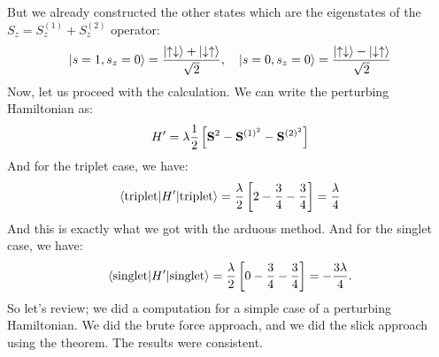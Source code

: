 But we already constructed the other states which are the eigenstates of the $S_z = S_z^{(1)} + S_z^{(2)}$ operator:
\begin{equation}
    \lvert s = 1, s_z = 0 \rangle = \frac{\lvert \uparrow\downarrow \rangle + \lvert \downarrow\uparrow \rangle}{\sqrt{2}}, \quad \lvert s = 0, s_z = 0 \rangle = \frac{\lvert \uparrow\downarrow \rangle - \lvert \downarrow\uparrow \rangle}{\sqrt{2}}
\end{equation}
Now, let us proceed with the calculation. We can write the perturbing Hamiltonian as:
\begin{equation}
    H' = \lambda \frac{1}{2}\left[\mathbf{S}^2 - \mathbf{S}^{(1)^2}  - \mathbf{S}^{(2)^2}\right]
\end{equation}
And for the triplet case, we have:
\begin{equation}
    \langle \text{triplet} \rvert H'\lvert \text{triplet} \rangle = \frac{\lambda}{2}\left[2 - \frac{3}{4} - \frac{3}{4}\right] = \frac{\lambda}{4}
\end{equation}
And this is exactly what we got with the arduous method. And for the singlet case, we have:
\begin{equation}
    \langle \text{singlet} \rvert H'\lvert \text{singlet} \rangle = \frac{\lambda}{2}\left[0 - \frac{3}{4} - \frac{3}{4}\right] = -\frac{3\lambda}{4}.
\end{equation}
So let's review; we did a computation for a simple case of a perturbing Hamiltonian. We did the brute force approach, and we did the slick approach using the theorem. The results were consistent.

